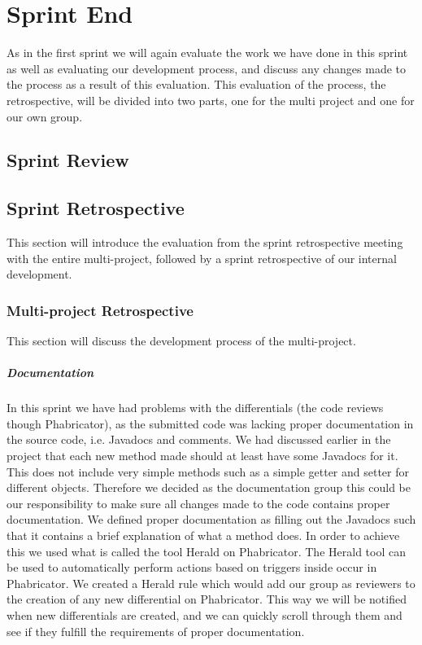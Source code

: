 \chapter{Sprint End}
As in the first sprint we will again evaluate the work we have done in this sprint as well as evaluating our development process, and discuss any changes made to the process as a result of this evaluation.
This evaluation of the process, the retrospective, will be divided into two parts, one for the multi project and one for our own group.
\section{Sprint Review}

\section{Sprint Retrospective}
This section will introduce the evaluation from the sprint retrospective meeting with the entire multi-project, followed by a sprint retrospective of our internal development.
\subsection*{Multi-project Retrospective}
This section will discuss the development process of the multi-project.
\paragraph{Documentation}
In this sprint we have had problems with the differentials (the code reviews though Phabricator), as the submitted code was lacking proper documentation in the source code, i.e. Javadocs and comments. 
We had discussed earlier in the project that each new method made should at least have some Javadocs for it.
This does not include very simple methods such as a simple getter and setter for different objects.
Therefore we decided as the documentation group this could be our responsibility to make sure all changes made to the code contains proper documentation.
We defined proper documentation as filling out the Javadocs such that it contains a brief explanation of what a method does.
In order to achieve this we used what is called the tool Herald on Phabricator.
The Herald tool can be used to automatically perform actions based on triggers inside occur in Phabricator.
We created a Herald rule which would add our group as reviewers to the creation of any new differential on Phabricator.
This way we will be notified when new differentials are created, and we can quickly scroll through them and see if they fulfill the requirements of proper documentation.

